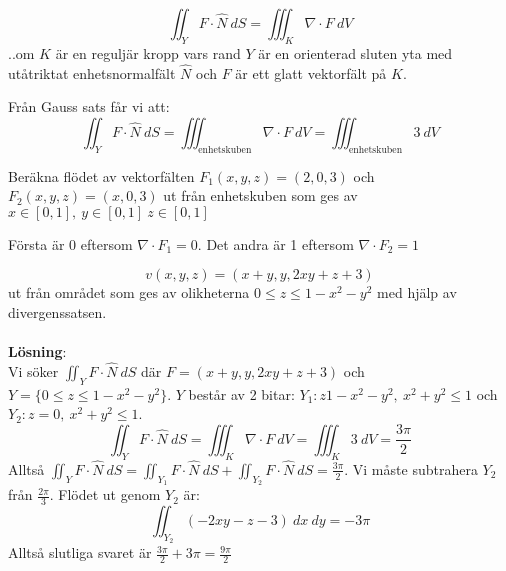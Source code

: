 \documentclass{report}
\begin{document}
{
\begin{equation*}
	\iint_{Y}^{} F \cdot \hat{N}   \: dS = \iiint_{K}^{} \nabla \cdot F  \: dV 
\end{equation*}
..om $ K $ är en reguljär kropp vars rand $ Y $ är en orienterad sluten yta med utåtriktat enhetsnormalfält $ \hat{N} $ och $ F $ är ett glatt vektorfält på $ K $.
}

{
Från Gauss sats får vi att:
\begin{equation*}
	\iint_{Y}^{} F \cdot \hat{N} \: dS = \iiint_{ \text{enhetskuben} }^{} \nabla \cdot F \: dV = \iiint_{ \text{enhetskuben} }^{} 3 \: dV   
\end{equation*}
}

\qs{}
{
	Beräkna flödet av vektorfälten $ F_1(x,y,z) = (2,0,3) $ och $ F_2(x,y,z) = (x,0,3) $ ut från enhetskuben som ges av $ x \in [0,1], \: y \in [0,1]\: z \in [0,1] $ 
}

\sol Första är 0 eftersom $ \nabla \cdot F_1 = 0 $. Det andra är 1 eftersom $ \nabla \cdot F_2 = 1 $  

\pagebreak
{}
{
\begin{equation*}
v(x,y,z) = (x+y, y, 2xy+z+3)
\end{equation*}
ut från området som ges av olikheterna $ 0 \le z \le 1-x^2-y^2 $ med hjälp av divergenssatsen.\\\\

\textbf{Lösning}:\\
Vi söker $ \iint_{Y}^{} F \cdot \hat{N} \: dS $ där $ F = (x+y, y, 2xy+z+3) $ och $ Y = \{ 0 \le z \le 1 - x^2-y^2 \}$. $ Y $ består av 2 bitar: $ Y_1: z 1 - x^2-y^2, \: x^2+y^2 \le 1 $ och $ Y_2: z = 0, \: x^2+y^2 \le 1 $. 
\begin{equation*}
	\iint_{Y}^{} F \cdot \hat{N} \: dS = \iiint_{K}^{} \nabla \cdot F \: dV = \iiint_{K}^{} 3 \: dV = \frac{3\pi}{2}    
\end{equation*}
Alltså $ \iint_{Y}^{} F \cdot \hat{N} \: dS = \iint_{Y_1}^{} F \cdot \hat{N} \: dS + \iint_{Y_2}^{} F \cdot \hat{N} \: dS = \frac{3\pi}{2}   $. Vi måste subtrahera $ Y_2 $ från $ \frac{2\pi}{3}  $. Flödet ut genom $ Y_2 $ är:
\begin{equation*}
\iint_{Y_2}^{} (-2xy-z-3) \: dx  \: dy = -3\pi 
\end{equation*}
Alltså slutliga svaret är $ \frac{3\pi}{2} + 3\pi = \frac{9\pi}{2}  $ 

}
\end{document}
